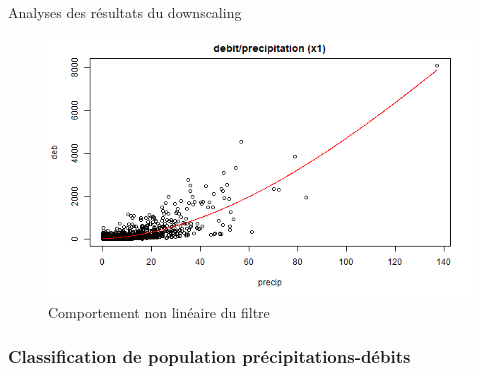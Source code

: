\documentclass{beamer}
\numberwithin{equation}{section}
\begin{document}
\begin{frame}{Analyses des résultats du downscaling}
\begin{minipage}[b]{0.5\linewidth}
\begin{figure}
				\centering \includegraphics[scale=0.2]{images/deb_rapport_pr_deg1.png}
				\caption{Comportement non linéaire du filtre}
			\end{figure}
		\end{minipage}
	\end{frame}
	
	\subsubsection{Classification de population précipitations-débits}
	
\end{document}
